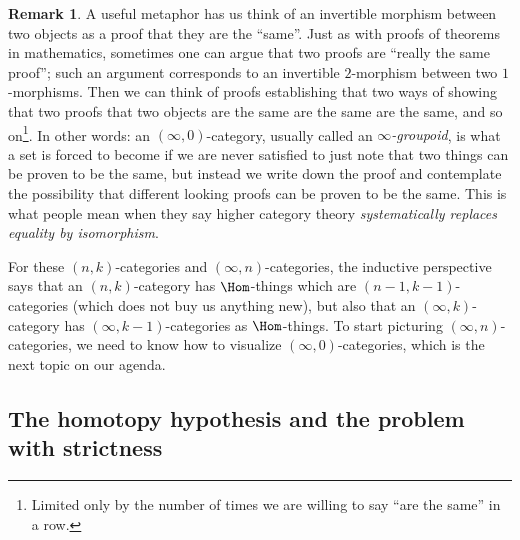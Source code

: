 \documentclass[12pt]{amsart}
\theoremstyle{definition} \newtheorem{definition}[theorem]{Definition}
\newtheorem{remark}[theorem]{Remark}
\numberwithin{equation}{section}
\newcommand{\oo}{\infty}
\begin{document}
\begin{remark}\label{metaphor} A useful metaphor has us think of an
  invertible morphism between two objects as a proof that they are the
  ``same''. Just as with proofs of theorems in mathematics, sometimes
  one can argue that two proofs are ``really the same proof''; such an
  argument corresponds to an invertible $2$-morphism between two
  $1$-morphisms. Then we can think of proofs establishing that two
  ways of showing that two proofs that two objects are the same are
  the same are the same, and so on\footnote{Limited only by the number
    of times we are willing to say ``are the same'' in a row.}. In
  other words: an $(\oo,0)$-category, usually called an
  \emph{$\oo$-groupoid}, is what a set is forced to become if we are
  never satisfied to just note that two things can be proven to be the
  same, but instead we write down the proof and contemplate the
  possibility that different looking proofs can be proven to be the
  same. This is what people mean when they say higher category theory
  \emph{systematically replaces equality by isomorphism}.
\end{remark}

For these $(n,k)$-categories and $(\oo,n)$-categories, the inductive
perspective says that an $(n,k)$-category has $\Hom$-things which are
$(n-1,k-1)$-categories (which does not buy us anything new), but also
that an $(\oo,k)$-category has $(\oo,k-1)$-categories as
$\Hom$-things. To start picturing $(\oo,n)$-categories, we need to
know how to visualize $(\oo,0)$-categories, which is the next topic
on our agenda.

\subsection{The homotopy hypothesis and the problem with strictness}
\label{strict}
\end{document}
